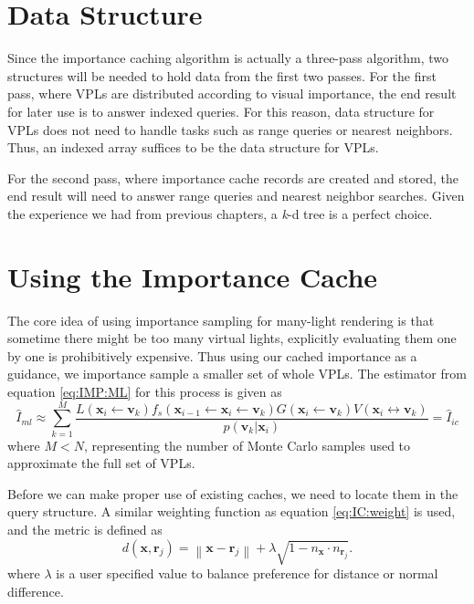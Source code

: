 \documentclass[]{book}
\begin{document}
\section{Data Structure}
\label{sec:imp_cache:data_structure}
Since the importance caching algorithm is actually a three-pass algorithm, two structures will be needed to hold data from the first two passes.
For the first pass, where VPLs are distributed according to visual importance, the end result for later use is to answer indexed queries.
For this reason, data structure for VPLs does not need to handle tasks such as range queries or nearest neighbors.
Thus, an indexed array suffices to be the data structure for VPLs.

For the second pass, where importance cache records are created and stored, the end result will need to answer range queries and nearest neighbor searches.
Given the experience we had from previous chapters, a \textit{k}-d tree is a perfect choice.

\section{Using the Importance Cache}
\label{sec:imp_cache:use_cache}
The core idea of using importance sampling for many-light rendering is that sometime there might be too many virtual lights, explicitly evaluating them one by one is prohibitively expensive.
Thus using our cached importance as a guidance, we importance sample a smaller set of whole VPLs.
The estimator from equation \ref{eq:IMP:ML} for this process is given as
\begin{equation}
	\widehat{I}_{ml} \approx \sum_{k=1}^{M} \frac{L(\textbf{x}_i \leftarrow \textbf{v}_k) f_s(\textbf{x}_{i-1} \leftarrow \textbf{x}_i \leftarrow \textbf{v}_k) G(\textbf{x}_i \leftarrow \textbf{v}_k) V(\textbf{x}_i \leftrightarrow \textbf{v}_k)}{p(\textbf{v}_k|\textbf{x}_i)} = \widehat{I}_{ic}
	\label{eq:IMP:IC}
\end{equation}
where $M<N$, representing the number of Monte Carlo samples used to approximate the full set of VPLs.

Before we can make proper use of existing caches, we need to locate them in the query structure.
A similar weighting function as equation \ref{eq:IC:weight} is used, and the metric is defined as
\begin{equation}
	d(\textbf{x}, \textbf{r}_j) =  \left \| \textbf{x} - \textbf{r}_j \right \| + \lambda \sqrt{1 - n_{\textbf{x}} \cdot n_{\textbf{r}_j}}.
\end{equation}
where $\lambda$ is a user specified value to balance preference for distance or normal difference.
\end{document}
